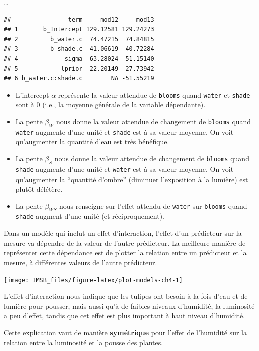 \documentclass[
  a4paper,11pt,twoside,onecolumn,openright,final,oldfontcommands]{memoir}
\theoremstyle{definition}
\theoremstyle{definition}
\theoremstyle{definition}
\theoremstyle{definition}
\theoremstyle{remark}
\begin{document}
\ldots{}

\begin{verbatim}
##                term     mod12     mod13
## 1       b_Intercept 129.12581 129.24273
## 2         b_water.c  74.47215  74.84815
## 3         b_shade.c -41.06619 -40.72284
## 4             sigma  63.28024  51.15140
## 5            lprior -22.20149 -27.73942
## 6 b_water.c:shade.c        NA -51.55219
\end{verbatim}

\begin{itemize}
\item
  L'intercept \(\alpha\) représente la valeur attendue de \texttt{blooms} quand \texttt{water} et \texttt{shade} sont à 0 (i.e., la moyenne générale de la variable dépendante).
\item
  La pente \(\beta_{W}\) nous donne la valeur attendue de changement de \texttt{blooms} quand \texttt{water} augmente d'une unité et \texttt{shade} est à sa valeur moyenne. On voit qu'augmenter la quantité d'eau est très bénéfique.
\item
  La pente \(\beta_{S}\) nous donne la valeur attendue de changement de \texttt{blooms} quand \texttt{shade} augmente d'une unité et \texttt{water} est à sa valeur moyenne. On voit qu'augmenter la ``quantité d'ombre'' (diminuer l'exposition à la lumière) est plutôt délétère.
\item
  La pente \(\beta_{WS}\) nous renseigne sur l'effet attendu de \texttt{water} sur \texttt{blooms} quand \texttt{shade} augment d'une unité (et réciproquement).
\end{itemize}

Dans un modèle qui inclut un effet d'interaction, l'effet d'un prédicteur sur la mesure va dépendre de la valeur de l'autre prédicteur. La meilleure manière de représenter cette dépendance est de plotter la relation entre un prédicteur et la mesure, à différentes valeurs de l'autre prédicteur.

\begin{center}\texttt{[image: IMSB\_files/figure-latex/plot-models-ch4-1]} \end{center}

L'effet d'interaction nous indique que les tulipes ont besoin à la fois d'eau et de lumière pour pousser, mais aussi qu'à de faibles niveaux d'humidité, la luminosité a peu d'effet, tandis que cet effet est plus important à haut niveau d'humidité.

Cette explication vaut de manière \textbf{symétrique} pour l'effet de l'humidité sur la relation entre la luminosité et la pousse des plantes.
\end{document}
